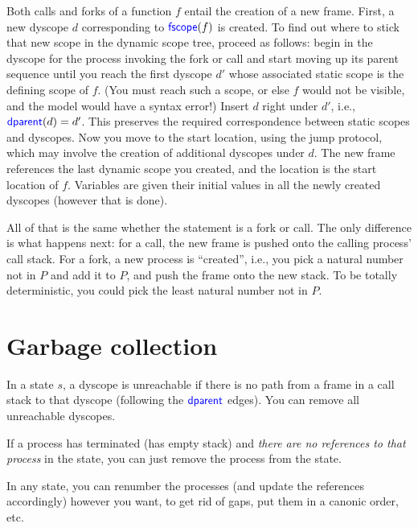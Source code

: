 Both calls and forks of a function $f$ entail the creation of a new
frame. First, a new dyscope $d$ corresponding to $\textup{\textsf{\textcolor{blue}{fscope}}}(f)$ is
created. To find out where to stick that new scope in the dynamic
scope tree, proceed as follows: begin in the dyscope for the
process invoking the fork or call and start moving up its parent
sequence until you reach the first dyscope $d'$ whose associated
static scope is the defining scope of $f$. (You must reach such a
scope, or else $f$ would not be visible, and the model would have a
syntax error!) Insert $d$ right under $d'$, i.e.,
$\textup{\textsf{\textcolor{blue}{dparent}}}(d)=d'$. This preserves the required correspondence between
static scopes and dyscopes. Now you move to the start location,
using the jump protocol, which may involve the creation of additional
dyscopes under $d$. The new frame references the last dynamic
scope you created, and the location is the start location of $f$.
Variables are given their initial values in all the newly created
dyscopes (however that is done).

All of that is the same whether the statement is a fork or call. The
only difference is what happens next: for a call, the new frame is
pushed onto the calling process' call stack. For a fork, a new process
is ``created'', i.e., you pick a natural number not in $P$ and
add it to $P$, and push the frame onto the new stack.   To be totally
deterministic, you could pick the least natural number not in $P$.

\section{Garbage collection}

In a state $s$, a dyscope is unreachable if there is no path
from a frame in a call stack to that dyscope (following the
$\textup{\textsf{\textcolor{blue}{dparent}}}$ edges).  You can remove all unreachable dyscopes.

If a process has terminated (has empty stack) and \emph{there are no
references to that process} in the state, you can just remove the process
from the state.

In any state, you can renumber the processes (and update the
references accordingly) however you want, to get rid of gaps, put them
in a canonic order, etc.

